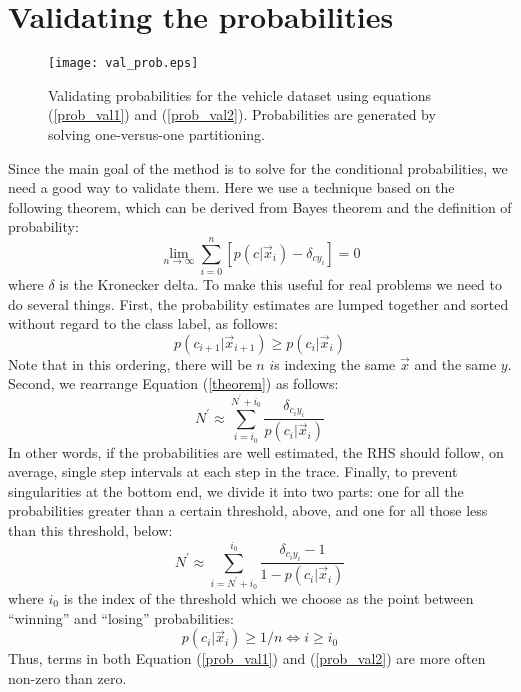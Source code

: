 \section{Validating the probabilities}

\begin{figure}
	\texttt{[image: val\_prob.eps]}
	\caption{Validating probabilities for the vehicle dataset
		using equations	(\ref{prob_val1}) and (\ref{prob_val2}).
		Probabilities are generated by solving one-versus-one 
		partitioning.}\label{val_prob}
\end{figure}

Since the main goal of the method 
is to solve for the conditional probabilities, 
we need a good way to validate them. 
Here we use a technique based on the
following theorem, which can be derived from Bayes theorem and the 
definition of probability:
\begin{equation}
	\lim_{n \rightarrow \infty} \sum_{i=0}^{n} \left [
	p(c | \vec x_i) - \delta_{cy_i} \right ] = 0
	\label{theorem}
\end{equation}
where $\delta$ is the Kronecker delta.
To make this useful for real problems we need to do several things.
First, the probability estimates are lumped together and sorted without regard
to the class label, as follows:
\begin{equation}
	p(c_{i+1} | \vec x_{i+1}) \ge p(c_i | \vec x_i)
\end{equation}
Note that in this ordering, there will be $n$ $i$s indexing the same $\vec x$ 
and the same $y$.
Second, we rearrange Equation (\ref{theorem}) as follows:
\begin{equation}
	N^\prime \approx \sum_{i=i_0}^{N^\prime+i_0} \frac{\delta_{c_i y_i}}{p(c_i | \vec x_i)}
	\label{prob_val1}
\end{equation}
In other words, if the probabilities are well estimated, the RHS should
follow, on average, single step intervals at each step in the trace.
Finally, to prevent singularities at the bottom end, 
we divide it into two parts:
one for all the probabilities greater than a certain threshold, above, 
and one for all those less than this threshold, below:
\begin{equation}
	N^\prime  \approx \sum_{i=N^\prime+i_0}^{i_0} \frac{\delta_{c_i y_i} - 1}{1 - p(c_i | \vec x_i)}
	\label{prob_val2}
\end{equation}
where $i_0$ is the index of the threshold which we choose as the
point between ``winning'' and ``losing'' probabilities:
\begin{equation}
	p(c_i | \vec x_i) \ge 1/n \iff i \ge i_0
\end{equation}
Thus, terms in both Equation (\ref{prob_val1}) and (\ref{prob_val2}) are more
often non-zero than zero.

